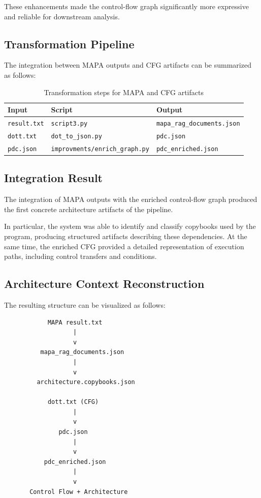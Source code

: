 \documentclass[11pt]{article}
\begin{document}
These enhancements made the control-flow graph significantly more expressive and reliable for downstream analysis.

\subsection*{Transformation Pipeline}

The integration between MAPA outputs and CFG artifacts can be summarized as follows:

\begin{table}[h]
\centering
\begin{tabular}{|l|l|l|}
\hline
\textbf{Input} & \textbf{Script} & \textbf{Output} \\
\hline
\texttt{result.txt} & \texttt{script3.py} & \texttt{mapa\_rag\_documents.json} \\
\hline
\texttt{dott.txt} & \texttt{dot\_to\_json.py} & \texttt{pdc.json} \\
\hline
\texttt{pdc.json} & \texttt{improvments/enrich\_graph.py} & \texttt{pdc\_enriched.json} \\
\hline
\end{tabular}
\caption{Transformation steps for MAPA and CFG artifacts}
\end{table}

\subsection*{Integration Result}

The integration of MAPA outputs with the enriched control-flow graph produced the first concrete architecture artifacts of the pipeline.

In particular, the system was able to identify and classify copybooks used by the program, producing structured artifacts describing these dependencies. At the same time, the enriched CFG provided a detailed representation of execution paths, including control transfers and conditions.

\subsection*{Architecture Context Reconstruction}

The resulting structure can be visualized as follows:

\begin{center}
\begin{verbatim}
            MAPA result.txt
                   |
                   v
          mapa_rag_documents.json
                   |
                   v
         architecture.copybooks.json

            dott.txt (CFG)
                   |
                   v
               pdc.json
                   |
                   v
           pdc_enriched.json
                   |
                   v
       Control Flow + Architecture
\end{verbatim}
\end{center}
\end{document}
